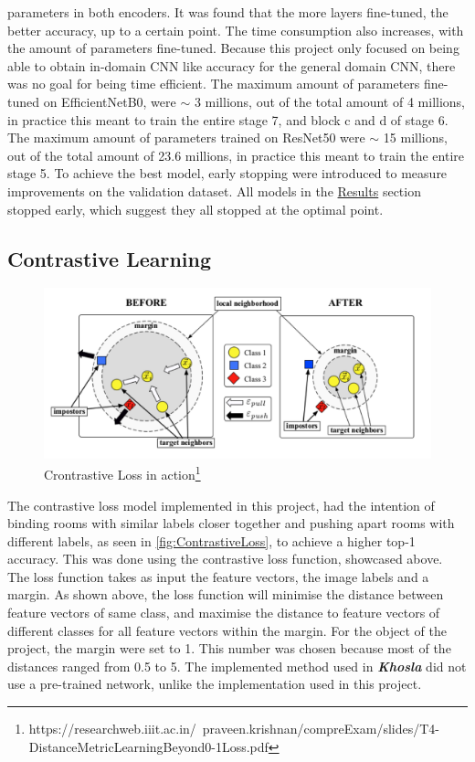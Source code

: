 parameters in both encoders. It was found that the more layers fine-tuned, the better accuracy, up to a certain point. The time consumption also increases, with the amount of parameters fine-tuned. Because this project only focused on being able to obtain in-domain CNN like accuracy for the general domain CNN, there was no goal for being time efficient. The maximum amount of parameters fine-tuned on EfficientNetB0, were $\sim$ 3 millions, out of the total amount of 4 millions, in practice this meant to train the entire stage 7, and block c and d of stage 6. The maximum amount of parameters trained on ResNet50 were $\sim$ 15 millions, out of the total amount of 23.6 millions, in practice this meant to train the entire stage 5. To achieve the best model, early stopping were introduced to measure improvements on the validation dataset. All models in the \hyperref[sec:Results]{Results} section stopped early, which suggest they all stopped at the optimal point.

\subsection{Contrastive Learning}
\begin{figure}[H]
    \centering
    \includegraphics[width =\textwidth]{pictures/random/ContrastiveLoss}
    \caption{Crontrastive Loss in action\footnote{https://researchweb.iiit.ac.in/~praveen.krishnan/compreExam/slides/T4-DistanceMetricLearningBeyond0-1Loss.pdf}}
    \label{fig:ContrastiveLoss}
\end{figure}
The contrastive loss model implemented in this project, had the intention of binding rooms with similar labels closer together and pushing apart rooms with different labels, as seen in \autoref{fig:ContrastiveLoss}, to achieve a higher top-1 accuracy. This was done using the contrastive loss function, showcased above. The loss function takes as input the feature vectors, the image labels and a margin. As shown above, the loss function will minimise the distance between feature vectors of same class, and maximise the distance to feature vectors of different classes for all feature vectors within the margin. For the object of the project, the margin were set to 1. This number was chosen because most of the distances ranged from 0.5 to 5. The implemented method used in \textbf{\textit{Khosla}}\autocite{khosla2020supervised} did not use a pre-trained network, unlike the implementation used in this project.

